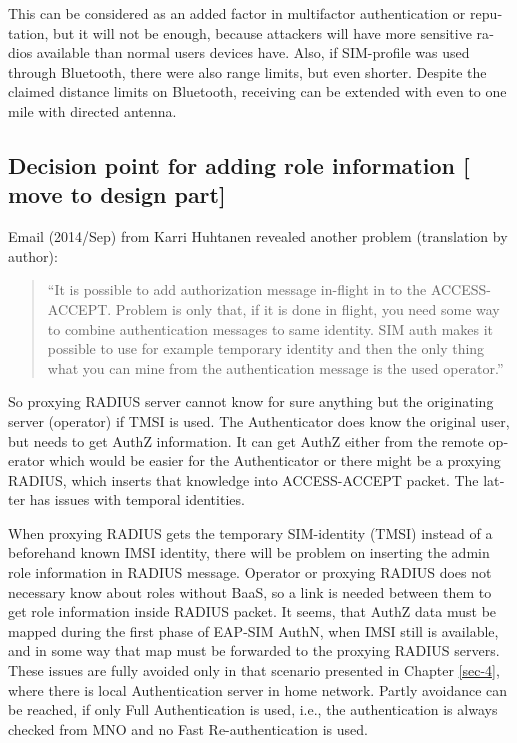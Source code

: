 \documentclass[12pt,a4paper,english]{tutthesis}
\begin{document}
\begin{otherlanguage}{english}
{This can be considered as an added factor in multifactor
authentication or reputation, but it will not be enough, because
attackers will have more sensitive  radios available than normal users
devices have. 
Also, if SIM-profile was used through Bluetooth, there were also
range limits, but even shorter. Despite the claimed distance limits
on Bluetooth, receiving can be extended with even to one mile with
directed antenna\cite{SANS-bluetooth-2007}.


\subsection{Decision point for adding role information [ move to design part]}
\label{sec-6-4-8}













Email (2014/Sep) from Karri Huhtanen revealed another
problem (translation by author):
\begin{quote}
``It is possible to add authorization message in-flight in to the
ACCESS-ACCEPT.
Problem is only that, if it is done in flight, you need some way to
combine authentication messages to same identity. SIM auth makes it
possible to use for example temporary identity and then the only thing
what you can mine from the authentication message is the used operator.''
\end{quote}

So proxying RADIUS server cannot know for sure anything but the
originating server (operator) if TMSI is used. The Authenticator does
know the original user, but needs to get AuthZ information. It can get
AuthZ either from the remote operator which would be easier for the
Authenticator or there might be a proxying RADIUS, which inserts that
knowledge into ACCESS-ACCEPT packet. The latter has issues with
temporal identities. 






When proxying RADIUS gets the temporary SIM-identity (TMSI) instead of
a beforehand known IMSI identity, there will be problem
on inserting the admin role information in RADIUS message.
Operator or proxying RADIUS 
does not necessary know about roles without BaaS, so a link
is needed between them to get role information inside RADIUS packet.
It seems, that AuthZ data must be mapped during the first phase of
EAP-SIM AuthN, when IMSI still is available, and in some way
that map must be forwarded to the proxying RADIUS servers.
These issues are fully avoided only in that scenario presented in Chapter
\ref{sec-4}, where there is local Authentication server in home network.
Partly avoidance can be reached, if only Full Authentication is
used, i.e., the authentication is always checked from MNO and no Fast
Re-authentication is used.

}
\end{otherlanguage}
\end{document}

